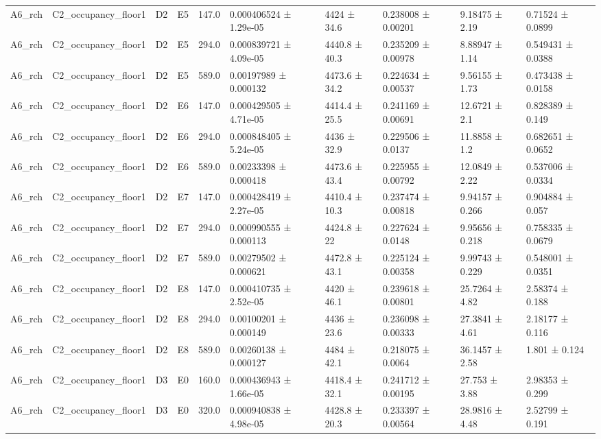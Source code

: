 \begin{table}
\begin{tabular}{llllllllll}
A6\_rch & C2\_occupancy\_floor1 & D2 & E5 & 147.0 & 0.000406524 ± 1.29e-05 & 4424 ± 34.6 & 0.238008 ± 0.00201 & 9.18475 ± 2.19 & 0.71524 ± 0.0899 \\
A6\_rch & C2\_occupancy\_floor1 & D2 & E5 & 294.0 & 0.000839721 ± 4.09e-05 & 4440.8 ± 40.3 & 0.235209 ± 0.00978 & 8.88947 ± 1.14 & 0.549431 ± 0.0388 \\
A6\_rch & C2\_occupancy\_floor1 & D2 & E5 & 589.0 & 0.00197989 ± 0.000132 & 4473.6 ± 34.2 & 0.224634 ± 0.00537 & 9.56155 ± 1.73 & 0.473438 ± 0.0158 \\
A6\_rch & C2\_occupancy\_floor1 & D2 & E6 & 147.0 & 0.000429505 ± 4.71e-05 & 4414.4 ± 25.5 & 0.241169 ± 0.00691 & 12.6721 ± 2.1 & 0.828389 ± 0.149 \\
A6\_rch & C2\_occupancy\_floor1 & D2 & E6 & 294.0 & 0.000848405 ± 5.24e-05 & 4436 ± 32.9 & 0.229506 ± 0.0137 & 11.8858 ± 1.2 & 0.682651 ± 0.0652 \\
A6\_rch & C2\_occupancy\_floor1 & D2 & E6 & 589.0 & 0.00233398 ± 0.000418 & 4473.6 ± 43.4 & 0.225955 ± 0.00792 & 12.0849 ± 2.22 & 0.537006 ± 0.0334 \\
A6\_rch & C2\_occupancy\_floor1 & D2 & E7 & 147.0 & 0.000428419 ± 2.27e-05 & 4410.4 ± 10.3 & 0.237474 ± 0.00818 & 9.94157 ± 0.266 & 0.904884 ± 0.057 \\
A6\_rch & C2\_occupancy\_floor1 & D2 & E7 & 294.0 & 0.000990555 ± 0.000113 & 4424.8 ± 22 & 0.227624 ± 0.0148 & 9.95656 ± 0.218 & 0.758335 ± 0.0679 \\
A6\_rch & C2\_occupancy\_floor1 & D2 & E7 & 589.0 & 0.00279502 ± 0.000621 & 4472.8 ± 43.1 & 0.225124 ± 0.00358 & 9.99743 ± 0.229 & 0.548001 ± 0.0351 \\
A6\_rch & C2\_occupancy\_floor1 & D2 & E8 & 147.0 & 0.000410735 ± 2.52e-05 & 4420 ± 46.1 & 0.239618 ± 0.00801 & 25.7264 ± 4.82 & 2.58374 ± 0.188 \\
A6\_rch & C2\_occupancy\_floor1 & D2 & E8 & 294.0 & 0.00100201 ± 0.000149 & 4436 ± 23.6 & 0.236098 ± 0.00333 & 27.3841 ± 4.61 & 2.18177 ± 0.116 \\
A6\_rch & C2\_occupancy\_floor1 & D2 & E8 & 589.0 & 0.00260138 ± 0.000127 & 4484 ± 42.1 & 0.218075 ± 0.0064 & 36.1457 ± 2.58 & 1.801 ± 0.124 \\
A6\_rch & C2\_occupancy\_floor1 & D3 & E0 & 160.0 & 0.000436943 ± 1.66e-05 & 4418.4 ± 32.1 & 0.241712 ± 0.00195 & 27.753 ± 3.88 & 2.98353 ± 0.299 \\
A6\_rch & C2\_occupancy\_floor1 & D3 & E0 & 320.0 & 0.000940838 ± 4.98e-05 & 4428.8 ± 20.3 & 0.233397 ± 0.00564 & 28.9816 ± 4.48 & 2.52799 ± 0.191 \\

\end{tabular}
\end{table}
